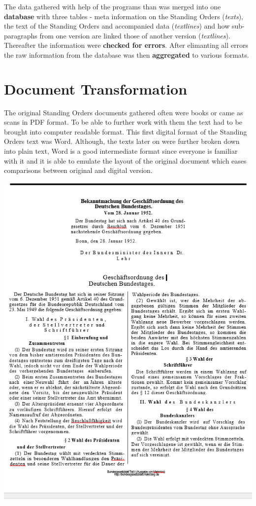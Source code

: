 \documentclass[10pt,]{article}
\begin{document}
The data gathered with help of the programs than was merged into one
\textbf{database} with three tables - meta information on the Standing
Orders (\emph{texts}), the text of the Standing Orders and accompanied
data (\emph{textlines}) and how sub-paragraphs from one version are
linked those of another version (\emph{textlines}). Thereafter the
information were \textbf{checked for errors}. After elimanting all
errors the raw information from the database was then
\textbf{aggregated} to various formats.

\newpage

\section{Document Transformation}\label{document-transformation}

The original Standing Orders documents gathered often were books or came
as scans in PDF format. To be able to further work with them the text
had to be brought into computer readable format. This first digital
format of the Standing Orders text was Word. Although, the texts later
on were further broken down into plain text, Word is a good intermediate
format since everyone is familiar with it and it is able to emulate the
layout of the original document which eases comparisons between original
and digital version.

\begin{center}
\includegraphics[height=0.7\textheight]{fig/fig1.png}
\end{center}
\end{document}
